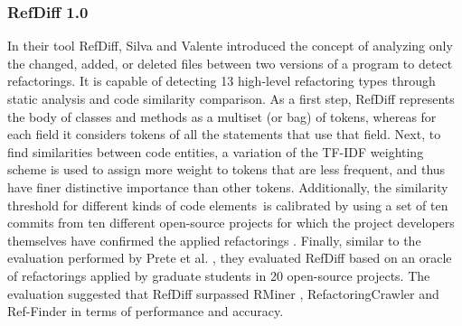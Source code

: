 \documentclass[letterpaper,12pt,onecolumn,final]{report}
\begin{document}
\subsubsection{RefDiff 1.0}
In their tool RefDiff, Silva and Valente \cite{Silva2017} introduced the concept of analyzing only the changed, added, or deleted files between two versions of a program to detect refactorings. It is capable of detecting 13 high-level refactoring types through static analysis and code similarity comparison. As a first step, RefDiff represents the body of classes and methods as a multiset (or bag) of tokens, whereas for each field it considers tokens of all the statements that use that field. Next, to find similarities between code entities, a variation of the TF-IDF weighting scheme \cite{Salton1986} is used to assign more weight to tokens that are less frequent, and thus have finer distinctive importance than other tokens. Additionally, the similarity threshold for different kinds of code elements is calibrated by using a set of ten commits from ten different open-source projects for which the project developers themselves have confirmed the applied refactorings \cite{Silva2016}. Finally, similar to the evaluation performed by Prete et al. \cite{Prete2010}, they evaluated RefDiff based on an oracle of refactorings applied by graduate students in 20 open-source projects. The evaluation suggested that RefDiff surpassed RMiner \cite{Silva2016}, RefactoringCrawler \cite{Dig2006} and Ref-Finder \cite{Prete2010} in terms of performance and accuracy.
\end{document}
